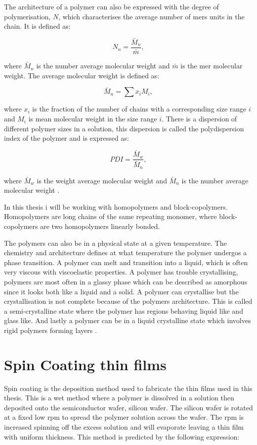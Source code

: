 \documentclass[MasterThesisMain.tex]{subfiles}
\begin{document}
The architecture of a polymer can also be expressed with the degree of polymerisation, $N$, which characterises the average number of mers units in the chain. It is defined as:

\begin{equation}
N_n = \frac{\bar{M}_n}{\bar{m}},
\end{equation}

where $\bar{M}_n$ is the number average molecular weight and $\bar{m}$ is the mer molecular weight. The average molecular weight is defined as:

\begin{equation}
\bar{M}_n = \sum x_iM_i,
\end{equation}      

where $x_i$ is the fraction of the number of chains with a corresponding size range $i$ and $M_i$ is mean molecular weight in the size range $i$. There is a dispersion of different polymer sizes in a solution, this dispersion is called the polydispersion index of the polymer and is expressed as:

\begin{equation}
PDI = \frac{\bar{M}_w}{\bar{M}_n},
\end{equation} 

where $\bar{M}_w$ is the weight average molecular weight and $\bar{M}_n$ is the number average molecular weight \cite{strobl2007physics}.

In this thesis i will be working with homopolymers and block-copolymers. Homopolymers are long chains of the same repeating monomer, where block-copolymers are two homopolymers linearly bonded.

The polymers can also be in a physical state at a given temperature. The chemistry and architecture defines at what temperature the polymer undergos a phase transition. A polymer can melt and transition into a liquid, which is often very viscous with viscoelastic properties. A polymer has trouble crystallising, polymers are most often in a glassy phase which can be described as amorphous since it looks both like a liquid and a solid. A polymer can crystallise but the crystallisation is not complete because of the polymers architecture. This is called a semi-crystalline state where the polymer has regions behaving liquid like and glass like. And lastly a polymer can be in a liquid crystalline state which involves rigid polymers forming layers \cite{petty2008molecular}. 

\section{Spin Coating thin films}
Spin coating is the deposition method used to fabricate the thin films used in this thesis. This is a wet method where a polymer is dissolved in a solution then deposited onto the semiconductor wafer, silicon wafer. The silicon wafer is rotated at a fixed low rpm to spread the polymer solution across the wafer. The rpm is increased spinning off the excess solution and will evaporate leaving a thin film with uniform thickness. This method is predicted by the following expression:
\end{document}
